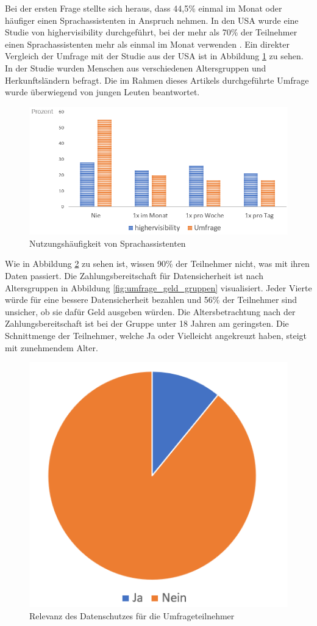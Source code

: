 Bei der ersten Frage stellte sich heraus, dass 44,5\% einmal im Monat oder häufiger einen Sprachassistenten in Anspruch nehmen. In den USA wurde eine Studie von \glqq highervisibility\grqq{} durchgeführt, bei der mehr als 70\% der Teilnehmer einen Sprachassistenten mehr als einmal im Monat verwenden \cite{highervisibility}.
Ein direkter Vergleich der Umfrage mit der Studie aus der USA ist in Abbildung \ref{fig:umfrage_haeufigkeit} zu sehen. In der Studie wurden Menschen aus verschiedenen Altersgruppen und Herkunftsländern befragt. Die im Rahmen dieses Artikels durchgeführte Umfrage wurde überwiegend von jungen Leuten beantwortet.

\begin{figure}[h]
	\centering
	\includegraphics[width=0.9\linewidth]{Picture/umfrage_haeufigkeit}
	\caption[Nutzungshäufigkeit von Sprachassistenten]{Nutzungshäufigkeit von Sprachassistenten}
	\label{fig:umfrage_haeufigkeit}
\end{figure} 

Wie in Abbildung \ref{fig:umfrage_datenschutz} zu sehen ist, wissen 90\% der Teilnehmer nicht, was mit ihren Daten passiert. Die Zahlungsbereitschaft für Datensicherheit ist nach Altersgruppen in Abbildung \ref{fig:umfrage_geld_gruppen} visualisiert. Jeder Vierte würde für eine bessere Datensicherheit bezahlen und 56\% der Teilnehmer sind unsicher, ob sie dafür Geld ausgeben würden. Die Altersbetrachtung nach der Zahlungsbereitschaft ist bei der Gruppe unter 18 Jahren am geringsten. Die Schnittmenge der Teilnehmer, welche \glqq Ja\grqq{} oder \glqq Vielleicht\grqq{} angekreuzt haben, steigt mit zunehmendem Alter.

\begin{figure}[h]
	\centering
	\includegraphics[width=0.5\linewidth]{Picture/umfrage_datenschutz}
	\caption[Relevanz des Datenschutzes für die Umfrageteilnehmer]{Relevanz des Datenschutzes für die Umfrageteilnehmer}
	\label{fig:umfrage_datenschutz}
\end{figure}

